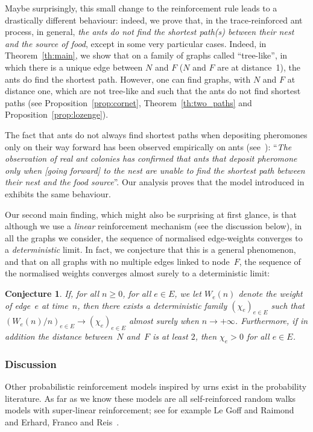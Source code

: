 \documentclass[JEP,XML,SOM,Unicode,NoFloatCountersInSection,published]{cedram}
\numberwithin{equation}{section}
\newtheorem{conjecture}[theorem]{Conjecture}
\theoremstyle{definition}
\begin{document}
Maybe surprisingly, this small change to the reinforcement rule leads to a drastically different behaviour:
indeed, we prove that, in the trace-reinforced ant process, in general,
\emph{the ants do not find the shortest path(s) between their nest and the source of food},
except in some very particular cases. Indeed,
in Theorem~\ref{th:main}, we show that on a family of graphs called ``tree-like'', in which there is a unique edge between $N$ and $F$ ($N$ and $F$ are at distance~1), the ants do find the shortest path. However, {one can find graphs, with $N$ and $F$ at distance one, which are not tree-like and such that the ants do not find shortest paths} (see Proposition~\ref{prop:cornet}, Theorem~\ref{th:two_paths} and Proposition~\ref{prop:lozenge}).

The fact that ants do not always find shortest paths when depositing pheromones only on their way
forward has been observed empirically on ants (see~\cite[\S 1.1.2]{book_ant}):
``\emph{The observation of real ant colonies has confirmed that ants that deposit pheromone only
when [going forward] to the nest are unable to find the shortest path between their nest and
the food source}''.
Our analysis proves that the model introduced in~\cite{KMS} exhibits the same behaviour.\enlargethispage{.5\baselineskip}%

Our second main finding, which might also be surprising at first glance, is that although we use a \emph{linear} reinforcement mechanism (see the discussion below), in all the graphs we consider, the sequence of normalised edge-weights converges to a \emph{deterministic} limit.
In fact, we conjecture that this is a general phenomenon, and that on all graphs with no multiple edges linked to node~$F$, the sequence of the normalised weights converges almost surely to a deterministic limit:
\begin{conjecture}\label{conj}
If, for all $n\geq 0$, for all $e\in E$, we let $W_e(n)$ denote the weight of edge~$e$ at time~$n$,
then there exists a deterministic family $(\chi_e)_{e\in E}$
such that $(W_e(n)/n)_{e\in E}\to (\chi_e)_{e\in E}$ almost surely when $n\to+\infty$.
Furthermore, if in addition the distance between~$N$ and~$F$ is at least $2$, then $\chi_e>0$ for all $e\in E$.
\end{conjecture}

\subsubsection*{Discussion}
Other {probabilistic reinforcement} models inspired by urns exist in the probability literature.
As far as we know these models are all self-reinforced random walks models with super-linear reinforcement;
see for example Le Goff and Raimond~\cite{LGR} and Erhard, Franco and Reis~\cite{EFR}.
\end{document}
